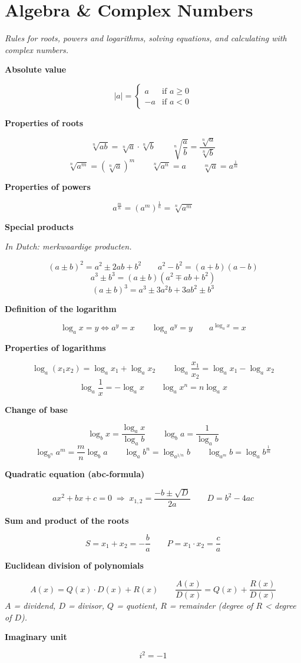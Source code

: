 \documentclass[11pt]{article}
\newcommand{\sect}[2]{\section*{\color{#1}#2}}       %
\newcommand{\sub}[1]{\par\medskip\textbf{#1}\par}     %
\newcommand{\expl}[1]{{\color{gray}\itshape #1}\par}  %
\begin{document}
\sect{cAlg}{Algebra \& Complex Numbers}
\expl{Rules for roots, powers and logarithms, solving equations, and calculating with complex numbers.}

\sub{Absolute value}
\[ |a| = \begin{cases} a & \text{if } a \ge 0 \\ -a & \text{if } a < 0 \end{cases} \]

\sub{Properties of roots}
\[ \sqrt[n]{ab} = \sqrt[n]{a}\cdot\sqrt[n]{b} \qquad \sqrt[n]{\frac{a}{b}} = \frac{\sqrt[n]{a}}{\sqrt[n]{b}} \]
\[ \sqrt[n]{a^m} = \left(\sqrt[n]{a}\right)^m \qquad \sqrt[n]{a^n} = a \qquad \sqrt[m]{a} = a^{\frac{1}{m}} \]

\sub{Properties of powers}
\[ a^{\frac{m}{n}} = \left(a^m\right)^{\frac{1}{n}} = \sqrt[n]{a^m} \]

\sub{Special products}
\expl{In Dutch: merkwaardige producten.}
\[ (a \pm b)^2 = a^2 \pm 2ab + b^2 \qquad a^2 - b^2 = (a+b)(a-b) \]
\[ a^3 \pm b^3 = (a \pm b)\left(a^2 \mp ab + b^2\right) \]
\[ (a \pm b)^3 = a^3 \pm 3a^2b + 3ab^2 \pm b^3 \]

\sub{Definition of the logarithm}
\[ \log_a x = y \iff a^y = x \qquad \log_a a^y = y \qquad a^{\log_a x} = x \]

\sub{Properties of logarithms}
\[ \log_a (x_1 x_2) = \log_a x_1 + \log_a x_2 \qquad \log_a \frac{x_1}{x_2} = \log_a x_1 - \log_a x_2 \]
\[ \log_a \frac{1}{x} = -\log_a x \qquad \log_a x^n = n \log_a x \]

\sub{Change of base}
\[ \log_b x = \frac{\log_a x}{\log_a b} \qquad \log_b a = \frac{1}{\log_a b} \]
\[ \log_{b^n} a^m = \frac{m}{n}\log_b a \qquad \log_a b^n = \log_{a^{1/n}} b \qquad \log_{a^m} b = \log_a b^{\frac{1}{m}} \]

\sub{Quadratic equation (abc-formula)}
\[ ax^2 + bx + c = 0 \;\Rightarrow\; x_{1,2} = \frac{-b \pm \sqrt{D}}{2a} \qquad D = b^2 - 4ac \]

\sub{Sum and product of the roots}
\[ S = x_1 + x_2 = -\frac{b}{a} \qquad P = x_1 \cdot x_2 = \frac{c}{a} \]

\sub{Euclidean division of polynomials}
\[ A(x) = Q(x)\cdot D(x) + R(x) \qquad \frac{A(x)}{D(x)} = Q(x) + \frac{R(x)}{D(x)} \]
\expl{$A$ = dividend, $D$ = divisor, $Q$ = quotient, $R$ = remainder (degree of $R$ < degree of $D$).}

\sub{Imaginary unit}
\[ i^2 = -1 \]
\end{document}
